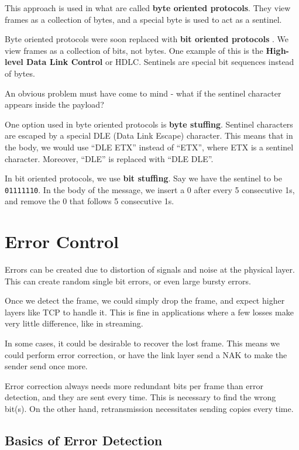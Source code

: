 \documentclass[12pt,letterpaper]{book}
\theoremstyle{definition}
\begin{document}
This approach is used in what are called \textbf{byte oriented protocols}. They view frames as a collection of bytes, and a special byte is used to act as a sentinel.

Byte oriented protocols were soon replaced with \textbf{bit oriented protocols} . We view frames as a collection of bits, not bytes. One example of this is the \textbf{High-level Data Link Control} or HDLC. Sentinels are special bit sequences instead of bytes.

An obvious problem must have come to mind - what if the sentinel character appears inside the payload?

One option used in byte oriented protocols is \textbf{byte stuffing}. Sentinel characters are escaped by a special DLE (Data Link Escape) character. This means that in the body, we would use ``DLE ETX'' instead of ``ETX'', where ETX is a sentinel character. Moreover, ``DLE'' is replaced with ``DLE DLE''.

In bit oriented protocols, we use \textbf{bit stuffing}. Say we have the sentinel to be \texttt{01111110}. In the body of the message, we insert a 0 after every 5 consecutive 1s, and remove the 0 that follows 5 consecutive 1s.

\section{Error Control}

Errors can be created due to distortion of signals and noise at the physical layer. This can create random single bit errors, or even large bursty errors.

Once we detect the frame, we could simply drop the frame, and expect higher layers like TCP to handle it. This is fine in applications where a few losses make very little difference, like in streaming.

In some cases, it could be desirable to recover the lost frame. This means we could perform error correction, or have the link layer send a NAK to make the sender send once more.

Error correction always needs more redundant bits per frame than error detection, and they are sent every time. This is necessary to find the wrong bit(s). On the other hand, retransmission necessitates sending copies every time.

\subsection{Basics of Error Detection}
\end{document}
